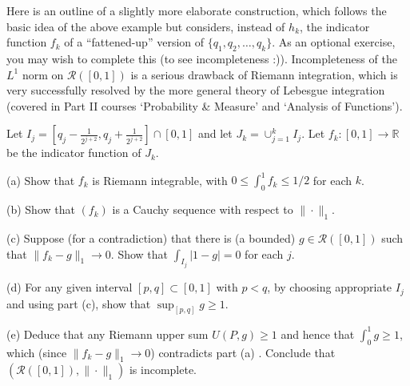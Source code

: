 Here is an outline of a slightly more elaborate construction, which follows the basic idea of the above example but considers, instead of $h_k$, the indicator function $f_k$ of a “fattened-up” version of $\{q_1,q_2,\ldots,q_k\}$. As an optional exercise, you may wish to complete this (to see incompleteness :)). Incompleteness of the $L^1$ norm on $\mathcal R([0,1])$ is a serious drawback of Riemann integration, which is very successfully resolved by the more general theory of Lebesgue integration (covered in Part II courses ‘Probability \& Measure’ and ‘Analysis of Functions’).

Let $I_j=[q_j-\frac{1}{2^{j+2}},q_j+\frac{1}{2^{j+2}}]\cap[0,1]$ and let $J_k=\cup_{j=1}^k I_j$. Let $f_k:[0,1]\to\mathbb R$ be the indicator function of $J_k$.

(a) Show that $f_k$ is Riemann integrable, with $0\le\int_0^1 f_k\le1/2$ for each $k$.

(b) Show that $(f_k)$ is a Cauchy sequence with respect to $\|\cdot\|_1$.

(c) Suppose (for a contradiction) that there is (a bounded) $g\in\mathcal R([0,1])$ such that $\|f_k-g\|_1\to0$. Show that $\int_{I_j}|1-g|=0$ for each $j$.

(d) For any given interval $[p,q]\subset[0,1]$ with $p<q$, by choosing appropriate $I_j$ and using part (c), show that $\sup_{[p,q]}g\ge1$.

(e) Deduce that any Riemann upper sum $U(P,g)\ge1$ and hence that $\int_0^1g\ge1$, which (since $\|f_k-g\|_1\to0$) contradicts part (a) . Conclude that $(\mathcal R([0,1]),\|\cdot\|_1)$ is incomplete.
